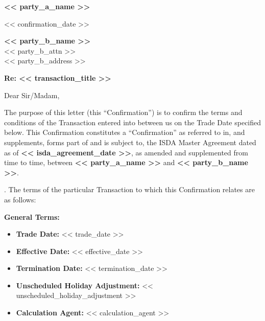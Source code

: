 \documentclass[11pt, a4paper]{article}
\begin{document}

\begin{center}
    \textbf{<< party_a_name >>}
\end{center}
\vspace{0.1cm}

\begin{flushright}
    << confirmation_date >>
\end{flushright}

\vspace{0.1cm}
\noindent \textbf{<< party_b_name >>} \\
\noindent << party_b_attn >> \\
\noindent << party_b_address >>

\vspace{0.2cm}
\noindent \textbf{Re: << transaction_title >>}

\vspace{0.15cm}
\noindent Dear Sir/Madam,

\vspace{0.15cm}
\noindent The purpose of this letter (this ``Confirmation'') is to confirm the terms and conditions of the Transaction entered into between us on the Trade Date specified below. This Confirmation constitutes a ``Confirmation'' as referred to in, and supplements, forms part of and is subject to, the ISDA Master Agreement dated as of \textbf{<< isda_agreement_date >>}, as amended and supplemented from time to time, between \textbf{<< party_a_name >>} and \textbf{<< party_b_name >>}.

\vspace{0.2cm}
. The terms of the particular Transaction to which this Confirmation relates are as follows:

\vspace{0.2cm}
\noindent \textbf{General Terms:}
\begin{itemize}[leftmargin=2cm, label={}, itemsep=1pt]
    \item \textbf{Trade Date:} << trade_date >>
    \item \textbf{Effective Date:} << effective_date >>
    \item \textbf{Termination Date:} << termination_date >>
    \item \textbf{Unscheduled Holiday Adjustment:} << unscheduled_holiday_adjustment >>
    \item \textbf{Calculation Agent:} << calculation_agent >>
\end{itemize}
\end{document}
